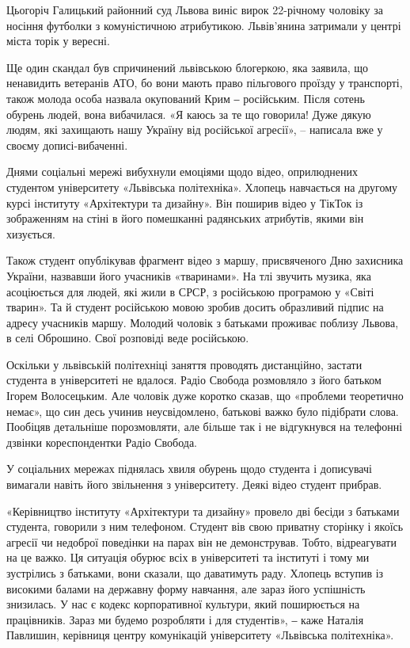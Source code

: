 \begin{multicols}{2}
Цьогоріч Галицький районний суд Львова виніс вирок 22-річному чоловіку за
носіння футболки з комуністичною атрибутикою. Львів'янина затримали у центрі
міста торік у вересні.

Ще один скандал був спричинений львівською блогеркою, яка заявила, що
ненавидить ветеранів АТО, бо вони мають право пільгового проїзду у транспорті,
також молода особа назвала окупований Крим ‒ російським. Після сотень обурень
людей, вона вибачилася. «Я каюсь за те що говорила! Дуже дякую людям, які
захищають нашу Україну від російської агресії», – написала вже у своєму
дописі-вибаченні.


Днями соціальні мережі вибухнули емоціями щодо відео, оприлюднених студентом
університету «Львівська політехніка». Хлопець навчається на другому курсі
інституту «Архітектури та дизайну». Він поширив відео у ТікТок із зображенням
на стіні в його помешканні радянських атрибутів, якими він хизується.

Також студент опублікував фрагмент відео з маршу, присвяченого Дню захисника
України, назвавши його учасників «тваринами». На тлі звучить музика, яка
асоціюється для людей, які жили в СРСР, з російською програмою у «Світі
тварин». Та й студент російською мовою зробив досить образливий підпис на
адресу учасників маршу. Молодий чоловік з батьками проживає поблизу Львова, в
селі Оброшино. Свої розповіді веде російською.

Оскільки у львівській політехніці заняття проводять дистанційно, застати
студента в університеті не вдалося. Радіо Свобода розмовляло з його батьком
Ігорем Волосецьким. Але чоловік дуже коротко сказав, що «проблеми теоретично
немає», що син десь учинив неусвідомлено, батькові важко було підібрати слова.
Пообіцяв детальніше порозмовляти, але більше так і не відгукнувся на телефонні
дзвінки кореспондентки Радіо Свобода.


У соціальних мережах піднялась хвиля обурень щодо студента і дописувачі
вимагали навіть його звільнення з університету. Деякі відео студент прибрав.

«Керівництво інституту «Архітектури та дизайну» провело дві бесіди з батьками
студента, говорили з ним телефоном. Студент вів свою приватну сторінку і якоїсь
агресії чи недоброї поведінки на парах він не демонстрував. Тобто, відреагувати
на це важко. Ця ситуація обурює всіх в університеті та інституті і тому ми
зустрілись з батьками, вони сказали, що даватимуть раду. Хлопець вступив із
високими балами на державну форму навчання, але зараз його успішність
знизилась. У нас є кодекс корпоративної культури, який поширюється на
працівників. Зараз ми будемо розробляти і для студентів», ‒ каже Наталія
Павлишин, керівниця центру комунікацій університету «Львівська політехніка».


\end{multicols}
